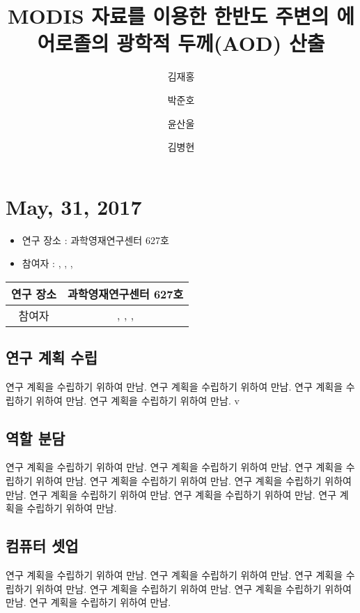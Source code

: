 \documentclass{research-note-v1.0}
\title{MODIS 자료를 이용한 한반도 주변의 에어로졸의 광학적 두께(AOD) 산출} %
\author[1] {김재홍} %
\author[2] {박준호} %
\author[3] {윤산울} %
\author[4] {김병현} %
\begin{document}
		
\section*{May, 31, 2017}

\begin{itemize}
	\item{연구 장소 : 과학영재연구센터 627호}
	\item{참여자 : {\@firstAuthor}, \@secondAuthor, \@thirdAuthor, \@fourthAuthor}
\end{itemize}

	\begin{table}[h]
		\label{table01}
		\begin{tabular}{|c|c|} 
			\hline
			연구 장소   &   과학영재연구센터 627호 \\ 
			\hline
			참여자   &   {\@firstAuthor}, \@secondAuthor, \@thirdAuthor, \@fourthAuthor  \\
			\hline
		\end{tabular}
	\end{table}

	\subsection*{연구 계획 수립}
							연구 계획을 수립하기 위하여 만남.
							연구 계획을 수립하기 위하여 만남.
								연구 계획을 수립하기 위하여 만남.
									연구 계획을 수립하기 위하여 만남.
									v
	
    \subsection*{역할 분담}
			연구 계획을 수립하기 위하여 만남.
				연구 계획을 수립하기 위하여 만남.
					연구 계획을 수립하기 위하여 만남.
						연구 계획을 수립하기 위하여 만남.
							연구 계획을 수립하기 위하여 만남.
								연구 계획을 수립하기 위하여 만남.
									연구 계획을 수립하기 위하여 만남.
										연구 계획을 수립하기 위하여 만남.
	\subsection*{컴퓨터 셋업}
		연구 계획을 수립하기 위하여 만남.
			연구 계획을 수립하기 위하여 만남.
				연구 계획을 수립하기 위하여 만남.
					연구 계획을 수립하기 위하여 만남.
						연구 계획을 수립하기 위하여 만남.
							연구 계획을 수립하기 위하여 만남.
\end{document}
